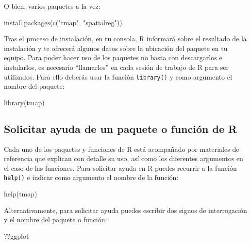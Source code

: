 \documentclass[
  11pt,
  oneside]{book}
\newenvironment{Shaded}{\begin{snugshade}}{\end{snugshade}}
\newcommand{\FunctionTok}[1]{\textcolor[rgb]{0.00,0.00,0.00}{#1}}
\newcommand{\NormalTok}[1]{#1}
\newcommand{\StringTok}[1]{\textcolor[rgb]{0.31,0.60,0.02}{#1}}
\begin{document}
O bien, varios paquetes a la vez:

\begin{Shaded}
\begin{Highlighting}[]
\FunctionTok{install.packages}\NormalTok{(}\FunctionTok{c}\NormalTok{(}\StringTok{"tmap"}\NormalTok{, }\StringTok{"spatialreg"}\NormalTok{))}
\end{Highlighting}
\end{Shaded}

Tras el proceso de instalación, en tu consola, R informará sobre el resultado de la instalación y te ofrecerá algunos datos sobre la ubicación del paquete en tu equipo. Para poder hacer uso de los paquetes no basta con descargarlos e instalarlos, es necesario ``llamarlos'' en cada sesión de trabajo de R para ser utilizados. Para ello deberás usar la función \texttt{library()} y como argumento el nombre del paquete:

\begin{Shaded}
\begin{Highlighting}[]
\FunctionTok{library}\NormalTok{(tmap)}
\end{Highlighting}
\end{Shaded}

\hypertarget{solicitar-ayuda-de-un-paquete-o-funciuxf3n-de-r}{%
\subsection{Solicitar ayuda de un paquete o función de R}\label{solicitar-ayuda-de-un-paquete-o-funciuxf3n-de-r}}

Cada uno de los paquetes y funciones de R está acompañado por materiales de referencia que explican con detalle su uso, así como los diferentes argumentos en el caso de las funciones. Para solicitar ayuda en R puedes recurrir a la función \texttt{help()} e indicar como argumento el nombre de la función:

\begin{Shaded}
\begin{Highlighting}[]
\FunctionTok{help}\NormalTok{(tmap)}
\end{Highlighting}
\end{Shaded}

Alternativamente, para solicitar ayuda puedes escribir dos signos de interrogación y el nombre del paquete o función:

\begin{Shaded}
\begin{Highlighting}[]
\NormalTok{??ggplot}
\end{Highlighting}
\end{Shaded}
\end{document}
